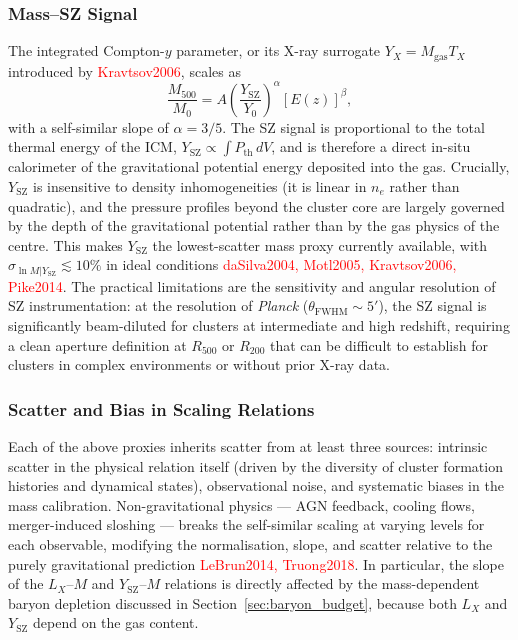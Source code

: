 \subsubsection{Mass--SZ Signal}
The integrated Compton-$y$ parameter, or its X-ray surrogate $Y_X = M_\mathrm{gas} T_X$ introduced by \textcolor{red}{Kravtsov2006}, scales as
\begin{equation}
	\frac{M_{500}}{M_0} = A \left( \frac{Y_{\mathrm{SZ}}}{Y_0} \right)^{\alpha} [E(z)]^{\beta},
	\label{eq:Ysz_mass}
\end{equation}
with a self-similar slope of $\alpha = 3/5$. The SZ signal is proportional to the total thermal energy of the ICM, $Y_{\mathrm{SZ}} \propto \int P_{\mathrm{th}}\, dV$, and is therefore a direct in-situ calorimeter of the gravitational potential energy deposited into the gas. Crucially, $Y_{\mathrm{SZ}}$ is insensitive to density inhomogeneities (it is linear in $n_e$ rather than quadratic), and the pressure profiles beyond the cluster core are largely governed by the depth of the gravitational potential rather than by the gas physics of the centre. This makes $Y_{\mathrm{SZ}}$ the lowest-scatter mass proxy currently available, with $\sigma_{\ln M | Y_\mathrm{SZ}} \lesssim 10\%$ in ideal conditions \textcolor{red}{daSilva2004, Motl2005, Kravtsov2006, Pike2014}. The practical limitations are the sensitivity and angular resolution of SZ instrumentation: at the resolution of \textit{Planck} ($\theta_\mathrm{FWHM} \sim 5'$), the SZ signal is significantly beam-diluted for clusters at intermediate and high redshift, requiring a clean aperture definition at $R_{500}$ or $R_{200}$ that can be difficult to establish for clusters in complex environments or without prior X-ray data.

\subsubsection{Scatter and Bias in Scaling Relations}

Each of the above proxies inherits scatter from at least three sources: intrinsic scatter in the physical relation itself (driven by the diversity of cluster formation histories and dynamical states), observational noise, and systematic biases in the mass calibration. Non-gravitational physics --- AGN feedback, cooling flows, merger-induced sloshing --- breaks the self-similar scaling at varying levels for each observable, modifying the normalisation, slope, and scatter relative to the purely gravitational prediction \textcolor{red}{LeBrun2014, Truong2018}. In particular, the slope of the $L_X$--$M$ and $Y_\mathrm{SZ}$--$M$ relations is directly affected by the mass-dependent baryon depletion discussed in Section~\ref{sec:baryon_budget}, because both $L_X$ and $Y_\mathrm{SZ}$ depend on the gas content.

